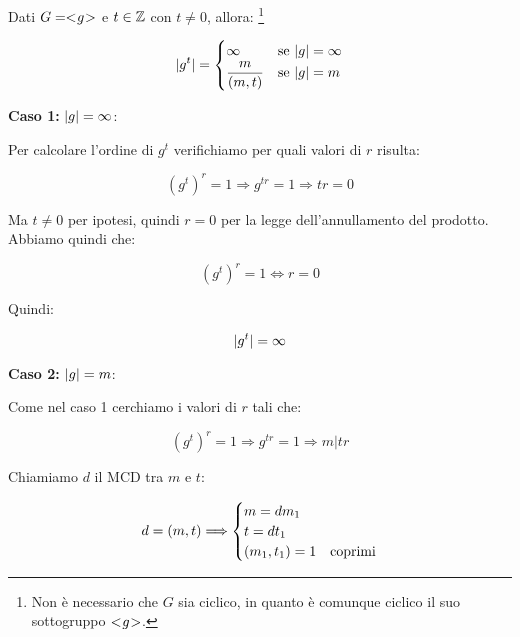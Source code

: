 \begin{teorema}
	\label{thr:Ciclici_ordine_elementi}
	Dati $G = < \negmedspace g \negmedspace >$ e $t \in \mathbb{Z}$ con $t \ne 0$, allora:
	\footnote{Non è necessario che $G$ sia ciclico, in quanto è comunque ciclico il suo sottogruppo $< \negmedspace g \negmedspace >$.}
	
	\begin{equation}
		\lvert g^t \rvert = 
		\begin{cases}
			\infty & \text{se } \lvert g \rvert = \infty \\
			\dfrac{m}{ ( m , t ) } & \text{se } \lvert g \rvert = m
		\end{cases}
	\end{equation} 
\end{teorema}
\begin{dimostrazione}
	\textbf{Caso 1:} $\lvert g \rvert = \infty$:
	
	Per calcolare l'ordine di $g^t$ verifichiamo per quali valori di $r$ risulta:
	
	\begin{equation}
		(g^t)^r = 1 \Longrightarrow g^{tr} = 1 \Longrightarrow tr = 0
	\end{equation}

	Ma $t \ne 0$ per ipotesi, quindi $r = 0$ per la legge dell'annullamento del prodotto. Abbiamo quindi che:
	
	\begin{equation}
		(g^t)^r = 1 \Longleftrightarrow r = 0
	\end{equation}

	Quindi:
	
	\begin{equation}
		\lvert g^t \rvert = \infty
	\end{equation}

	\textbf{Caso 2:} $\lvert g \rvert = m$:
	
	Come nel caso 1 cerchiamo i valori di $r$ tali che:
	
	\begin{equation}
		(g^t)^r = 1 \Longrightarrow g^{tr} = 1 \Longrightarrow m|tr
	\end{equation}

	Chiamiamo $d$ il MCD tra $m$ e $t$:
	
	\begin{equation}
		d =  ( m , t )  \Longrightarrow
		\begin{cases}
			m = d m_1 \\
			t = d t_1 \\
			 ( m_1 , t_1 )  = 1 &\text{coprimi}
		\end{cases}
	\end{equation}


\end{dimostrazione}
